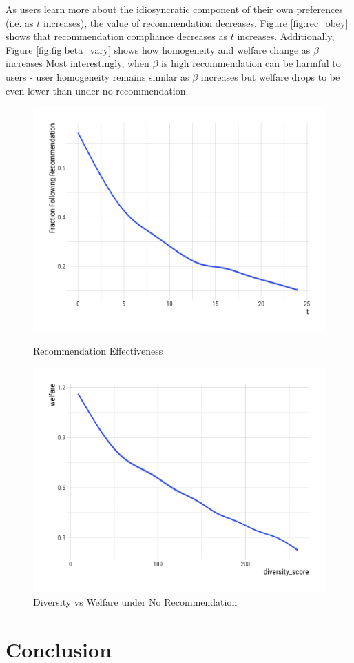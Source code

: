 \documentclass[sigconf]{acmart}
\begin{document}
\par
As users learn more about the idiosyncratic component of their own preferences (i.e. as $t$ increases), the value of recommendation decreases. Figure \ref{fig:rec_obey} shows that recommendation compliance decreases as $t$ increases. Additionally, Figure \ref{fig:fig:beta_vary} shows how homogeneity and welfare change as $\beta$ increases  Most interestingly, when $\beta$ is high recommendation can be harmful to users - user homogeneity remains similar as $\beta$ increases but welfare drops to be even lower than under no recommendation.


\begin{figure}
   \begin{minipage}{0.48\textwidth}
     \centering
     \includegraphics[width=.5\linewidth]{figures/rec_obedience_25}
     \caption{Recommendation Effectiveness}\label{fig:rec_obey}
   \end{minipage}\hfill
   \begin{minipage}{0.48\textwidth}
     \centering
     \includegraphics[width=.5\linewidth]{"figures/Diversity vs Welfare - No Recommendation"}
     \caption{Diversity vs Welfare under No Recommendation}\label{fig:diversity_welfare_no_rec}
   \end{minipage}
\end{figure}

\section{Conclusion}
\end{document}

